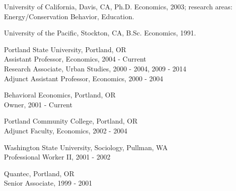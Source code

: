 \documentclass[Computer Science]{vita}
\begin{document}


  

\begin{vita}

  \begin{Degrees}
  \item University of California, Davis, CA, Ph.D. Economics, 2003;
    research areas: Energy/Conservation Behavior, Education.

  \item University of the Pacific, Stockton, CA, B.Sc. Economics,
    1991.
  \end{Degrees}

  \begin{Experience}
	
  \item Portland State University,  Portland, OR\\
    Assistant Professor, Economics, 2004 - Current\\
    Research Associate, Urban Studies, 2000 - 2004, 2009 - 2014\\
    Adjunct Assistant Professor, Economics, 2000 - 2004
	
  \item Behavioral Economics, Portland, OR\\
    Owner, 2001 - Current
		
  \item Portland Community College, Portland, OR\\
    Adjunct Faculty, Economics, 2002 - 2004
	
  \item Washington State University, Sociology, Pullman, WA\\
    Professional Worker II, 2001 - 2002
	
  \item Quantec, Portland, OR\\
    Senior Associate, 1999 - 2001
	

\end{Experience}
\end{vita}
\end{document}
